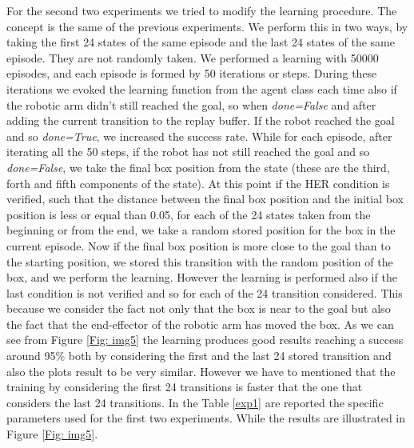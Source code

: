 \documentclass[a4paper]{report}
\begin{document}
For the second two experiments we tried to modify the learning procedure. The concept is the same of the previous experiments. We perform this in two ways, by taking the first 24 states of the same episode and the last 24 states of the same episode. They are not randomly taken. We performed a learning with 50000 episodes, and each episode is formed by 50 iterations or steps. During these iterations we evoked the learning function from the agent class each time also if the robotic arm didn't still reached the goal, so when \textit{done=False} and after adding the current transition to the replay buffer. If the robot reached the goal and so \textit{done=True}, we increased the success rate. While for each episode, after iterating all the 50 steps, if the robot has not still reached the goal and so \textit{done=False}, we take the final box position from the state (these are the third, forth and fifth components of the state). At this point if the HER condition is verified, such that the distance between the final box position and the initial box position is less or equal than 0.05, for each of the 24 states taken from the beginning or from the end, we take a random stored position for the box in the current episode. Now if the final box position is more close to the goal than to the starting position, we stored this transition with the random position of the box, and we perform the learning. However the learning is performed also if the last condition is not verified and so for each of the 24 transition considered. This because we consider the fact not only that the box is near to the goal but also the fact that the end-effector of the robotic arm has moved the box. As we can see from Figure \ref{Fig: img5} the learning produces good results reaching a success around 95\% both by considering the first and the last 24 stored transition and also the plots result to be very similar. However we have to mentioned that the training by considering the first 24 transitions is faster that the one that considers the last 24 transitions. In the Table \ref{exp1} are reported the specific parameters used for the first two experiments. While the results are illustrated in Figure \ref{Fig: img5}.
\end{document}
